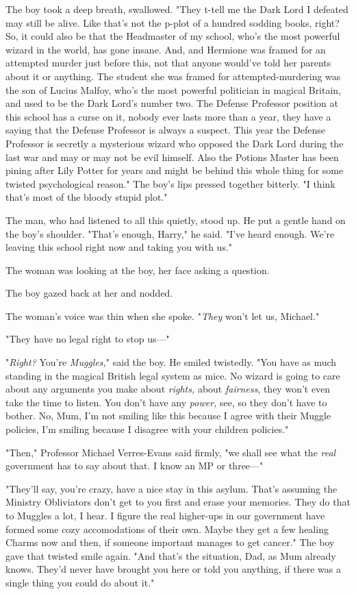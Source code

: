 The boy took a deep breath, swallowed. "They t-tell me the Dark Lord I defeated
may still be alive. Like that's not the p-plot of a hundred sodding books,
right? So, it could also be that the Headmaster of my school, who's the most
powerful wizard in the world, has gone insane. And, and Hermione was framed for
an attempted murder just before this, not that anyone would've told her parents
about it or anything. The student she was framed for attempted-murdering was
the son of Lucius Malfoy, who's the most powerful politician in magical
Britain, and used to be the Dark Lord's number two. The Defense Professor
position at this school has a curse on it, nobody ever lasts more than a year,
they have a saying that the Defense Professor is always a suspect. This year
the Defense Professor is secretly a mysterious wizard who opposed the Dark Lord
during the last war and may or may not be evil himself. Also the Potions Master
has been pining after Lily Potter for years and might be behind this whole
thing for some twisted psychological reason." The boy's lips pressed together
bitterly. "I think that's most of the bloody stupid plot."

The man, who had listened to all this quietly, stood up. He put a gentle hand
on the boy's shoulder. "That's enough, Harry," he said. "I've heard enough.
We're leaving this school right now and taking you with us."

The woman was looking at the boy, her face asking a question.

The boy gazed back at her and nodded.

The woman's voice was thin when she spoke. "\emph{They} won't let us, Michael."

"They have no legal right to stop us---"

"\emph{Right?} You're \emph{Muggles,}" said the boy. He smiled twistedly. "You
have as much standing in the magical British legal system as mice. No wizard is
going to care about any arguments you make about \emph{rights,} about
\emph{fairness}, they won't even take the time to listen. You don't have any
\emph{power,} see, so they don't have to bother. No, Mum, I'm not smiling like
this because I agree with their Muggle policies, I'm smiling because I disagree
with your children policies."

"Then," Professor Michael Verres-Evans said firmly, "we shall see what the
\emph{real} government has to say about that. I know an MP or three---"

"They'll say, you're crazy, have a nice stay in this asylum. That's assuming
the Ministry Obliviators don't get to you first and erase your memories. They
do that to Muggles a lot, I hear. I figure the real higher-ups in our
government have formed some cozy accomodations of their own. Maybe they get a
few healing Charms now and then, if someone important manages to get cancer."
The boy gave that twisted smile again. "And that's the situation, Dad, as Mum
already knows. They'd never have brought you here or told you anything, if
there was a single thing you could do about it."

